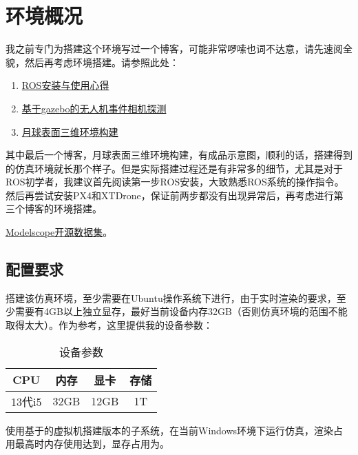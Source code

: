 \documentclass{article}
\begin{document}
\section{环境概况}
我之前专门为搭建这个环境写过一个博客，可能非常啰嗦也词不达意，请先速阅全貌，然后再考虑环境搭建。请参照此处：
\begin{enumerate}
  \item \href{https://bugbubbles.github.io/2024/04/%E9%99%A8%E7%9F%B3%E5%9D%91/ros%E5%AE%89%E8%A3%85%E4%B8%8E%E4%BD%BF%E7%94%A8%E5%BF%83%E5%BE%97/}{ROS安装与使用心得}
  \item \href{https://bugbubbles.github.io/2024/04/%E9%99%A8%E7%9F%B3%E5%9D%91/%E5%9F%BA%E4%BA%8Egazebo%E7%9A%84%E6%97%A0%E4%BA%BA%E6%9C%BA%E4%BA%8B%E4%BB%B6%E7%9B%B8%E6%9C%BA%E6%8E%A2%E6%B5%8B/}{基于gazebo的无人机事件相机探测}
  \item \href{https://bugbubbles.github.io/2024/04/%E9%99%A8%E7%9F%B3%E5%9D%91/%E6%9C%88%E7%90%83%E8%A1%A8%E9%9D%A2%E4%B8%89%E7%BB%B4%E7%8E%AF%E5%A2%83%E6%9E%84%E5%BB%BA/}{月球表面三维环境构建}
\end{enumerate}\par
其中最后一个博客，月球表面三维环境构建，有成品示意图，顺利的话，搭建得到的仿真环境就长那个样子。但是实际搭建过程还是有非常多的细节，尤其是对于ROS初学者，我建议首先阅读第一步ROS安装，大致熟悉ROS系统的操作指令。然后再尝试安装PX4和XTDrone，保证前两步都没有出现异常后，再考虑进行第三个博客的环境搭建。\par
{}\href{https://www.modelscope.cn/datasets/BugBubbles/KaguyaLORC}{Modelscope开源数据集}。
\subsection{配置要求}
搭建该仿真环境，至少需要在Ubuntu操作系统下进行，由于实时渲染的要求，至少需要有4GB以上独立显存，最好当前设备内存32GB（否则仿真环境的范围不能取得太大）。作为参考，这里提供我的设备参数：
\begin{table}[H]
  \caption{设备参数}
  \centering
  \begin{tabular}{cccc}
    \toprule
    CPU & 内存 & 显卡& 存储\\
    \hline
     13代i5 &32GB      & 12GB   & 1T \\
    \bottomrule
  \end{tabular}
  \label{tab:device}
\end{table}
使用基于的虚拟机搭建版本的子系统，在当前Windows环境下运行仿真，渲染占用最高时内存使用达到，显存占用为。
\end{document}
